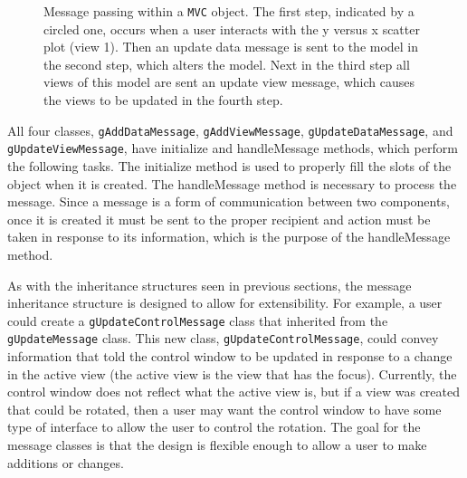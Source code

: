 \documentclass{article}[11pt]
\newcommand{\Rfunction}[1]{{\textsf{#1}}}
\newcommand{\Robject}[1]{{\texttt{#1}}}
\newcommand{\Rclass}[1]{\texttt{#1}}
\begin{document}
\begin{figure}[ht]
  \begin{center}
    \caption{ Message passing within a \Robject{MVC} object.  The first step,
      indicated by a circled one, occurs when a user interacts with the y
      versus x scatter plot (view 1).  Then an update data message is sent to
      the model in the second step, which alters the model.  Next in the third
      step all views of this model are sent an update view message, which
      causes the views to be updated in the fourth step. }
    \label{Fig:MPwithin}
  \end{center}
\end{figure}

All four classes, \Rclass{gAddDataMessage}, \Rclass{gAddViewMessage},
\Rclass{gUpdateDataMessage}, and \Rclass{gUpdateViewMessage}, have
\Rfunction{initialize} and \Rfunction{handleMessage} methods, which perform
the following tasks.  The \Rfunction{initialize} method is used to properly
fill the slots of the object when it is created.  The
\Rfunction{handleMessage} method is necessary to process the message.  Since a
message is a form of communication between two components, once it is created
it must be sent to the proper recipient and action must be taken in response
to its information, which is the purpose of the \Rfunction{handleMessage}
method. 

As with the inheritance structures seen in previous sections, the message
inheritance structure is designed to allow for extensibility.  For example, a
user could create a \Rclass{gUpdateControlMessage} class that inherited from
the \Rclass{gUpdateMessage} class.  This new class,
\Rclass{gUpdateControlMessage}, could convey information that told the
control window to be updated in response to a change in the active view (the
active view is the view that has the focus).  Currently, the control window
does not reflect what the active view is, but if a view was created that could
be rotated, then a user may want the control window to have some type of
interface to allow the user to control the rotation.  The goal for the message
classes is that the design is flexible enough to allow a user to make
additions or changes. 
\end{document}
